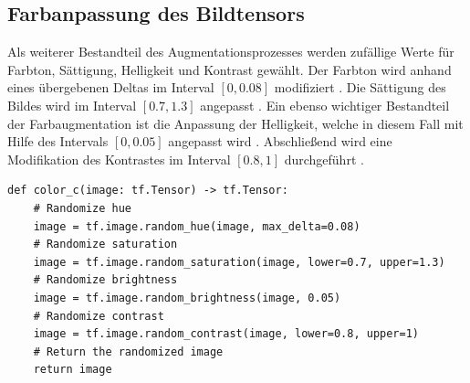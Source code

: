 \subsection{Farbanpassung des Bildtensors}

Als weiterer Bestandteil des Augmentationsprozesses werden zufällige Werte für Farbton, Sättigung, Helligkeit und Kontrast gewählt. 
Der Farbton wird anhand eines übergebenen Deltas im Interval $[0,0.08]$ modifiziert \cite{tf_r_hue}. Die Sättigung des Bildes wird im Interval $[0.7,1.3]$ angepasst \cite{tf_r_saturation}. Ein ebenso wichtiger Bestandteil der Farbaugmentation ist die Anpassung der Helligkeit, welche in diesem Fall mit Hilfe des Intervals $[0,0.05]$ angepasst wird \cite{tf_r_brightness}. Abschließend wird eine Modifikation des Kontrastes im Interval $[0.8,1]$ durchgeführt \cite{tf_r_contrast}. 

\vspace*{10mm}

\begin{lstlisting}[caption={Python Funktion zum zufälligen Ändern des Farbwertes}]
	def color_c(image: tf.Tensor) -> tf.Tensor:
    # Randomize hue
    image = tf.image.random_hue(image, max_delta=0.08)
    # Randomize saturation
    image = tf.image.random_saturation(image, lower=0.7, upper=1.3)
    # Randomize brightness
    image = tf.image.random_brightness(image, 0.05)
    # Randomize contrast
    image = tf.image.random_contrast(image, lower=0.8, upper=1)
    # Return the randomized image
    return image
\end{lstlisting}

